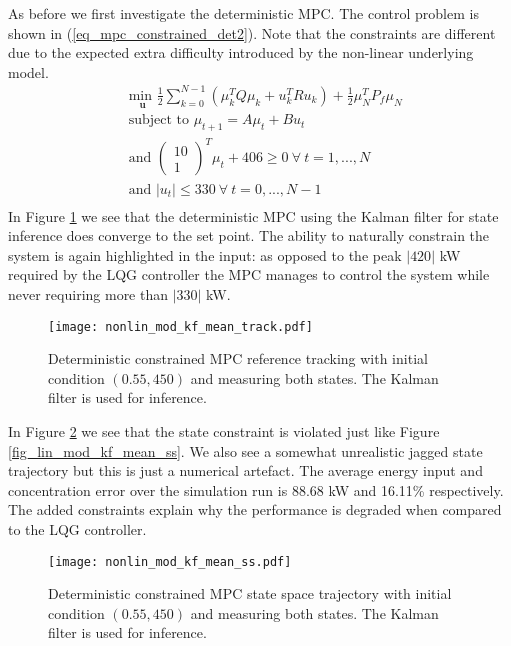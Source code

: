 As before we first investigate the deterministic MPC. The control problem is shown in (\ref{eq_mpc_constrained_det2}). Note that the constraints are different due to the expected extra difficulty introduced by the non-linear underlying model. 
\begin{equation}
\begin{aligned}
&\underset{\mathbf{u}}{\text{min }} \frac{1}{2}\sum_{k=0}^{N-1} \left( \mu_k^TQ\mu_k + u_k^TRu_k \right) + \frac{1}{2}\mu_N^TP_f\mu_N \\
& \text{subject to } \mu_{t+1}=A\mu_t + Bu_t \\
&\text{and } \begin{pmatrix}
10 \\ 1
\end{pmatrix}^T \mu_t + 406 \geq 0 ~\forall ~t=1,...,N\\
& \text{and } |u_t| \leq 330 ~\forall ~t=0,...,N-1\\
\end{aligned}
\label{eq_mpc_constrained_det2}
\end{equation}
In Figure \ref{fig_nonlin_mod_kf_mean_track} we see that the deterministic MPC using the Kalman filter for state inference does converge to the set point. The ability to naturally constrain the system is again highlighted in the input: as opposed to the peak $|420|$ kW required by the LQG controller the MPC manages to control the system while never requiring more than $|330|$ kW. 
\begin{figure}[H] 
\centering
\texttt{[image: nonlin\_mod\_kf\_mean\_track.pdf]}
\caption{Deterministic constrained MPC reference tracking with initial condition $(0.55, 450)$ and measuring both states. The Kalman filter is used for inference.}
\label{fig_nonlin_mod_kf_mean_track}
\end{figure} 
In Figure \ref{fig_nonlin_mod_kf_mean_ss} we see that the state constraint is violated just like Figure \ref{fig_lin_mod_kf_mean_ss}. We also see a somewhat unrealistic jagged state trajectory but this is just a numerical artefact. The average energy input and concentration error over the simulation run is 88.68 kW and 16.11\% respectively. The added constraints explain why the performance is degraded when compared to the LQG controller.
\begin{figure}[H] 
\centering
\texttt{[image: nonlin\_mod\_kf\_mean\_ss.pdf]}
\caption{Deterministic constrained MPC state space trajectory with initial condition $(0.55, 450)$ and measuring both states. The Kalman filter is used for inference.}
\label{fig_nonlin_mod_kf_mean_ss}
\end{figure}
